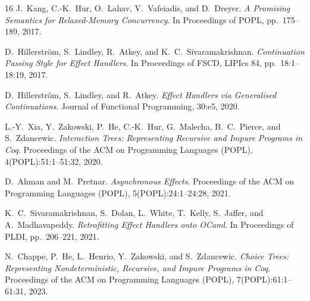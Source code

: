 \documentclass[UTF8,a4paper,11pt,fontset=fandol]{ctexart}
\begin{document}
{\begin{thebibliography}{16}
J.~Kang, C.-K.~Hur, O.~Lahav, V.~Vafeiadis, and D.~Dreyer.
\emph{A Promising Semantics for Relaxed-Memory Concurrency}.
In Proceedings of POPL, pp.~175--189, 2017.

D.~Hillerström, S.~Lindley, R.~Atkey, and K.~C.~Sivaramakrishnan.
\emph{Continuation Passing Style for Effect Handlers}.
In Proceedings of FSCD, LIPIcs 84, pp.~18:1--18:19, 2017.

D.~Hillerström, S.~Lindley, and R.~Atkey.
\emph{Effect Handlers via Generalised Continuations}.
Journal of Functional Programming, 30:e5, 2020.

L.-Y.~Xia, Y.~Zakowski, P.~He, C.-K.~Hur, G.~Malecha, B.~C.~Pierce, and S.~Zdancewic.
\emph{Interaction Trees: Representing Recursive and Impure Programs in Coq}.
Proceedings of the ACM on Programming Languages (POPL), 4(POPL):51:1--51:32, 2020.

D.~Ahman and M.~Pretnar.
\emph{Asynchronous Effects}.
Proceedings of the ACM on Programming Languages (POPL), 5(POPL):24:1--24:28, 2021.

K.~C.~Sivaramakrishnan, S.~Dolan, L.~White, T.~Kelly, S.~Jaffer, and A.~Madhavapeddy.
\emph{Retrofitting Effect Handlers onto OCaml}.
In Proceedings of PLDI, pp.~206--221, 2021.

N.~Chappe, P.~He, L.~Henrio, Y.~Zakowski, and S.~Zdancewic.
\emph{Choice Trees: Representing Nondeterministic, Recursive, and Impure Programs in Coq}.
Proceedings of the ACM on Programming Languages (POPL), 7(POPL):61:1--61:31, 2023.

\end{thebibliography}
}
\end{document}
